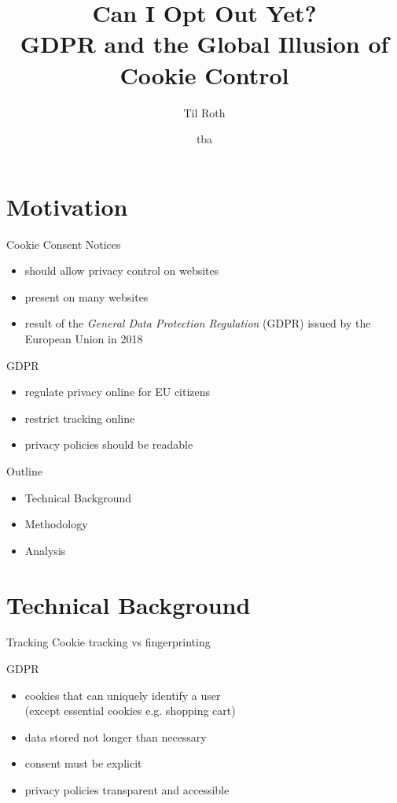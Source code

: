 \documentclass[xcolor={dvipsnames}]{beamer}
\date{tba}
\author{Til Roth}
\title{Can I Opt Out Yet? \\GDPR and the Global Illusion of Cookie Control}
\institute{Hot Topics in Data Networks WS22/23\\Saarland Informatics Campus}
\begin{document}
\maketitle

\section{Motivation}

\begin{frame}{Cookie Consent Notices}
	\begin{itemize}
		\item should allow privacy control on websites
		\item present on many websites
		\item result of the \emph{General Data Protection Regulation} (GDPR) issued by the European Union in 2018
	\end{itemize}
\end{frame}

\begin{frame}{GDPR}
	\begin{itemize}
		\item regulate privacy online for EU citizens
		\item restrict tracking online
		\item privacy policies should be readable
	\end{itemize}
\end{frame}

\begin{frame}{Outline}
    \begin{itemize}
        \item Technical Background
        \item Methodology
        \item Analysis
    \end{itemize}
\end{frame}

\section{Technical Background}

\begin{frame}{Tracking}
    \centering
    Cookie tracking vs fingerprinting
\end{frame}

\begin{frame}{GDPR}
    \begin{itemize}
        \item cookies that can uniquely identify a user\\(except essential cookies e.g. shopping cart)
        \item data stored not longer than necessary
        \item consent must be explicit
        \item privacy policies transparent and accessible
    \end{itemize}
\end{frame}
\end{document}
